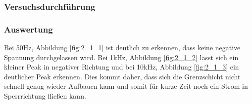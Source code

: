 \documentclass[12pt,a4paper]{article}
\begin{document}
\subsubsection{Versuchsdurchführung}

\subsubsection{Auswertung}
Bei 50Hz, Abbildung \ref{fig:2_1_1} ist deutlich zu erkennen, dass keine negative Spannung durchgelassen wird. Bei 1kHz, Abbildung \ref{fig:2_1_2} lässt sich ein kleiner Peak in negativer Richtung und bei 10kHz, Abbildung \ref{fig:2_1_3} ein deutlicher Peak erkennen. Dies kommt daher, dass sich die Grenzschicht nicht schnell genug wieder Aufbauen kann und somit für kurze Zeit noch ein Strom in Sperrrichtung fließen kann.
\end{document}
